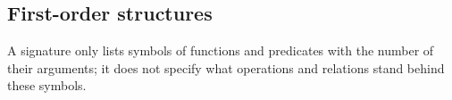 

\setcounter{section}{1}
\setcounter{subsection}{4}
\setcounter{dfn}{10}

\subsection{First-order structures}
A signature only lists symbols of functions and predicates with the number of their arguments;
it does not specify what operations and relations stand behind these symbols.



